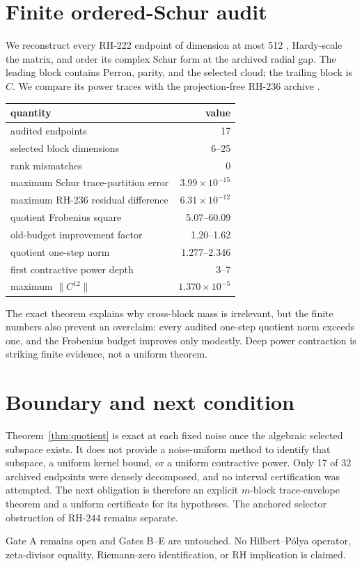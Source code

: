 \documentclass[11pt]{article}
\begin{document}
\section{Finite ordered-Schur audit}

We reconstruct every RH-222 endpoint of dimension at most 512
\citep{WangRH222}, Hardy-scale the matrix, and order its complex Schur form at
the archived radial gap.  The leading block contains Perron, parity, and the
selected cloud; the trailing block is $C$.  We compare its power traces with
the projection-free RH-236 archive \citep{WangRH236}.

\begin{center}
\small
\begin{tabular}{lr}
\toprule
quantity & value\\
\midrule
audited endpoints & 17\\
selected block dimensions & 6--25\\
rank mismatches & 0\\
maximum Schur trace-partition error & $3.99\times10^{-15}$\\
maximum RH-236 residual difference & $6.31\times10^{-12}$\\
quotient Frobenius square & 5.07--60.09\\
old-budget improvement factor & 1.20--1.62\\
quotient one-step norm & 1.277--2.346\\
first contractive power depth & 3--7\\
maximum $\|C^{12}\|$ & $1.370\times10^{-5}$\\
\bottomrule
\end{tabular}
\end{center}

The exact theorem explains why cross-block mass is irrelevant, but the
finite numbers also prevent an overclaim: every audited one-step quotient
norm exceeds one, and the Frobenius budget improves only modestly.  Deep
power contraction is striking finite evidence, not a uniform theorem.

\section{Boundary and next condition}

Theorem~\ref{thm:quotient} is exact at each fixed noise once the algebraic
selected subspace exists.  It does not provide a noise-uniform method to
identify that subspace, a uniform kernel bound, or a uniform contractive
power.  Only 17 of 32 archived endpoints were densely decomposed, and no
interval certification was attempted.  The next obligation is therefore an
explicit $m$-block trace-envelope theorem and a uniform certificate for its
hypotheses.  The anchored selector obstruction of RH-244 remains separate.

Gate A remains open and Gates B--E are untouched.  No Hilbert--P\'olya
operator, zeta-divisor equality, Riemann-zero identification, or RH
implication is claimed.



\end{document}
